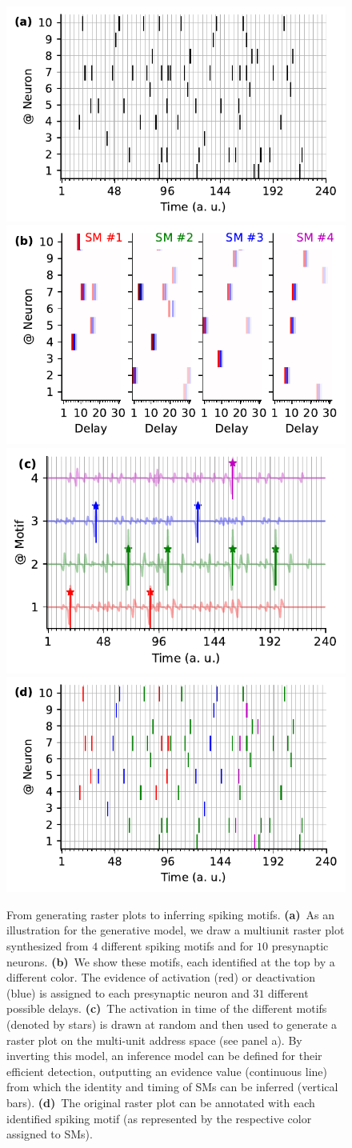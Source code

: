 \documentclass[runningheads]{llncs}
\begin{document}
\begin{figure}%
  \includegraphics[width=.50\linewidth]{figures/THC_toy-a_k.pdf}
  \includegraphics[width=.50\linewidth]{figures/THC_toy-b.pdf}
  \\
  \includegraphics[width=.50\linewidth]{figures/THC_toy-c.pdf}
  \includegraphics[width=.50\linewidth]{figures/THC_toy-a.pdf} 
\caption{From generating raster plots to inferring spiking motifs. \textbf{(a)}~As an illustration for the generative model, we draw a multiunit raster plot synthesized from $4$ different spiking motifs and for $10$ presynaptic neurons. \textbf{(b)}~We show these motifs, each identified at the top by a different color. The evidence of activation (red) or deactivation (blue) is assigned to each presynaptic neuron and $31$ different possible delays. \textbf{(c)}~The activation in time of the different motifs (denoted by stars) is drawn at random and then used to generate a raster plot on the multi-unit address space (see panel a). By inverting this model, an inference model can be defined for their efficient detection, outputting an evidence value (continuous line) from which the identity and timing of SMs can be inferred (vertical bars). \textbf{(d)}~The original raster plot can be annotated with each identified spiking motif (as represented by the respective color assigned to SMs).
}
\label{fig:THC}
\end{figure}
\end{document}
